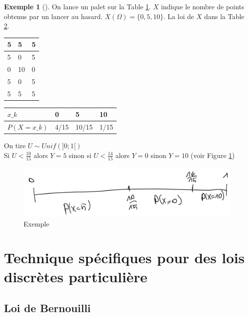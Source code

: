 \documentclass{article}
\theoremstyle{plain}%
\theoremstyle{definition}
\newtheorem{exmp}{Exemple}[section]
\theoremstyle{remark}
\begin{document}
\begin{exmp}[]
	On lance un palet sur la Table \ref{fig2}. $ X $ indique le nombre de points obtenus par un lancer au hasard. $ X(\Omega ) = \{0,5,10\} $. La loi de $ X $ dans la Table \ref{fig3}.
	
	\begin{table}[!ht]
		\centering
		\label{fig2}
		\begin{tabular}{|l|l|l|}
		\hline
			5 & 5 & 5 \\ \hline
			5 & 0 & 5 \\ \hline
			0 & 10 & 0 \\ \hline
			5 & 0 & 5 \\ \hline
			5 & 5 & 5 \\ \hline
		\end{tabular}
	\end{table}

	\begin{table}[!ht]
		\centering
		\label{fig3}
		\begin{tabular}{|l|l|l|l|}
		\hline
			$x\_k$ & 0 & 5 & 10 \\ \hline
			$ P(X=x\_k)$ & 4/15 & 10/15 & 1/15 \\ \hline
		\end{tabular}
	\end{table}

	On tire $ U \sim Unif(]0;1[) $\\
	Si $ U < \frac{10}{15} $  alors $ Y=5 $ sinon si $ U < \frac{14}{15} $ alors $ Y=0 $ sinon $ Y=10 $ (voir Figure \ref{fig4})

	\begin{figure}[!htbp]
		\centering
		\includegraphics*[width=.5\textwidth]{./figures3/fig4.png}
		\caption{Exemple}
		\label{fig4}
	\end{figure}

\end{exmp}

\section{Technique spécifiques pour des lois discrètes particulière}
\subsection{Loi de Bernouilli}
\end{document}
